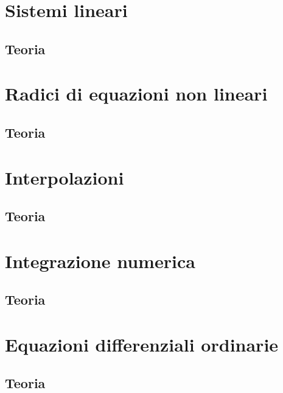 \documentclass[letterpaper,12pt]{article}
\begin{document}
\section{Sistemi lineari}
\subsection{Teoria}

\section{Radici di equazioni non lineari}
\subsection{Teoria}

\section{Interpolazioni}
\subsection{Teoria}

\section{Integrazione numerica}
\subsection{Teoria}

\section{Equazioni differenziali ordinarie}
\subsection{Teoria}
\end{document}
